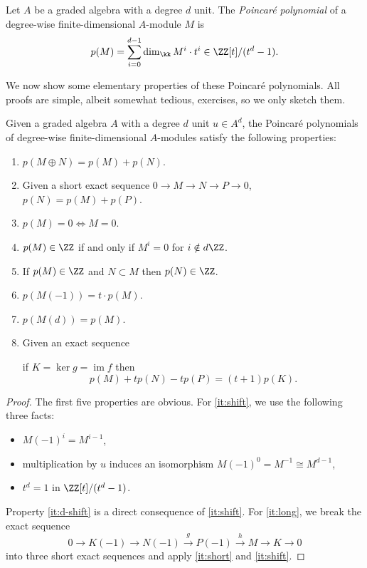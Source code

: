 \documentclass[a4paper]{amsart}
\begin{document}
\begin{definition}
  Let $A$ be a graded algebra with a degree $d$ unit. The \emph{Poincaré polynomial} of a degree-wise finite-dimensional $A$-module $M$ is 
  \[p(M)=\sum_{i=0}^{d-1}\dim_{\kk}M^i\cdot t^i\in\ZZ[t]/(t^d-1).\]
\end{definition}

We now show some elementary properties of these Poincaré polynomials. All proofs are simple, albeit somewhat tedious, exercises, so we only sketch them.

\begin{proposition}
  \label{prop:poincare}
  Given a graded algebra $A$ with a degree $d$ unit $u\in A^d$, the Poincaré polynomials of degree-wise finite-dimensional $A$-modules satisfy the following properties:
  \begin{enumerate}
    \item $p(M\oplus N)=p(M)+p(N)$.
    \item\label{it:short} Given a short exact sequence $0\to M\to N\to P\to 0$, $p(N)=p(M)+p(P)$.
    \item\label{it:zero} $p(M)=0\Leftrightarrow M=0$.
    \item\label{it:poincare_Z} $p(M)\in\ZZ$ if and only if $M^i=0$ for $i\notin d\ZZ$.
    \item\label{it:poincare_Z_sub} If $p(M)\in\ZZ$ and $N\subset M$ then $p(N)\in\ZZ$.
    \item\label{it:shift} $p(M(-1))=t\cdot p(M)$.
    \item\label{it:d-shift} $p(M(d))=p(M)$.
    \item\label{it:long} Given an exact sequence
    \begin{center}
    \end{center}
    if $K=\ker g=\operatorname{im} f$ then
    \[p(M)+tp(N)-tp(P)=(t+1)p(K).\]
  \end{enumerate}
\end{proposition}
\begin{proof}
  The first five properties are obvious. For \eqref{it:shift}, we use the following three facts:
  \begin{itemize}
    \item $M(-1)^i=M^{i-1}$,
    \item multiplication by $u$ induces an isomorphism $M(-1)^0=M^{-1}\cong M^{d-1}$,
    \item $t^d=1$ in $\ZZ[t]/(t^d-1)$.
  \end{itemize}
  Property \eqref{it:d-shift} is a direct consequence of \eqref{it:shift}.
  For \eqref{it:long}, we break the exact sequence
  \[0\to K(-1)\to N(-1)\stackrel{g}{\to} P(-1)\stackrel{h}{\to} M\to K\to 0\]
  into three short exact sequences and apply \eqref{it:short} and \eqref{it:shift}.
\end{proof}
\end{document}
